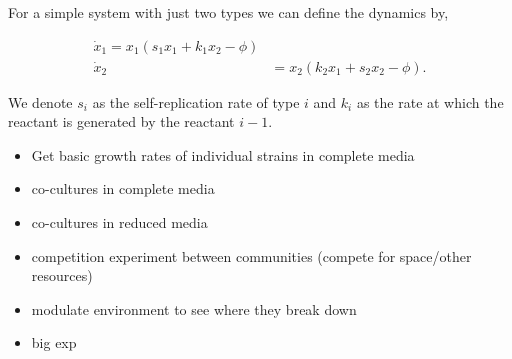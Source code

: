 For a simple system with just two types we can define the dynamics by,

\begin{align}
	\dot{x}_1 =  x_1 (s_1 x_1 + k_1 x_2 - \phi) \nonumber \\
	\dot{x}_2 &=  x_2 (k_2 x_1 + s_2 x_2 - \phi).
\end{align}

We denote $s_i$ as the self-replication rate of type $i$ and $k_i$ as the rate at which the reactant is generated by the reactant $i-1$.

\begin{itemize}
	\item Get basic growth rates of individual strains in complete media
	\item co-cultures in complete media
	\item co-cultures in reduced media
	\item competition experiment between communities (compete for space/other resources)
	\item modulate environment to see where they break down
	\item big exp
\end{itemize}
